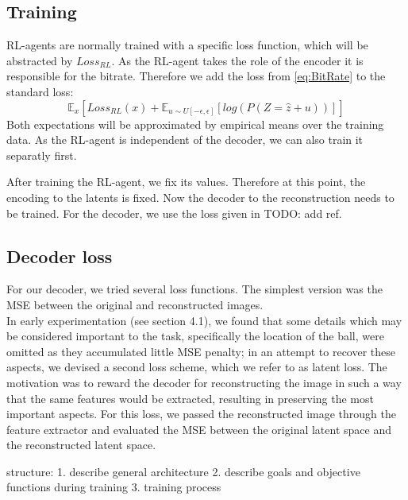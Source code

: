 



\subsection{Training}
    RL-agents are normally trained with a specific loss function, which will be
    abstracted by $Loss_{RL}$. As the RL-agent takes the role of the encoder it
    is responsible for the bitrate. Therefore we add the loss from
    \ref{eq:BitRate} to the standard loss:
    \begin{equation}
        \mathbb{E}_{x}[Loss_{RL}(x) + \mathbb{E}_{u \sim U[-\epsilon, \epsilon]}[log(P(Z=\hat{z} + u))]]
    \end{equation}
    Both expectations will be approximated by empirical means over the training
    data. As the RL-agent is independent of the decoder, we can also train it
    separatly first.

    After training the RL-agent, we fix its values. Therefore at this point, the
    encoding to the latents is fixed. Now the decoder to the reconstruction
    needs to be trained. For the decoder, we use the loss given in TODO: add ref. 

\subsection{Decoder loss}
For our decoder, we tried several loss functions. The simplest version was the MSE between the original and reconstructed images. \\
In early experimentation (see section 4.1), we found that some details which may be considered important to the task, specifically the location of the ball, were omitted as they accumulated little MSE penalty; in an attempt to recover these aspects, we devised a second loss scheme, which we refer to as latent loss. The motivation was to reward the decoder for reconstructing the image in such a way that the same features would be extracted, resulting in preserving the most important aspects. For this loss, we passed the reconstructed image through the feature extractor and evaluated the MSE between the original latent space and the reconstructed latent space.










structure:
1. describe general architecture
2. describe goals and objective functions during training
3. training process